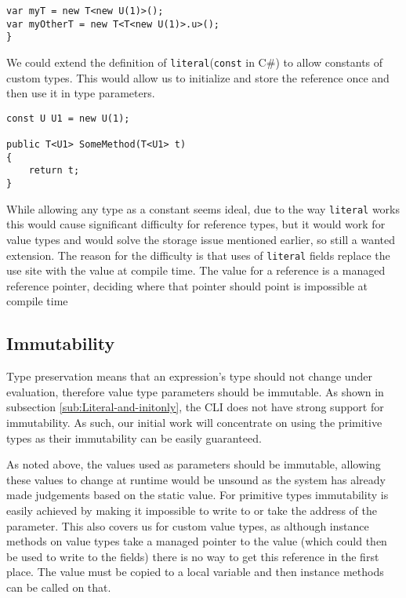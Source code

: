 \begin{lstlisting}[label={lst:refissue},caption={An issue with reference values},keywordstyle={\color{blue}},language=sharpc]
var myT = new T<new U(1)>();
var myOtherT = new T<T<new U(1)>.u>();
}
\end{lstlisting}

We could extend the definition of \texttt{literal}(\texttt{const} in C\#) to allow constants of custom types. This would allow us to 
initialize and store the reference once and then use it in type parameters.

\begin{lstlisting}[caption={Literal references},keywordstyle={\color{blue}},language=sharpc]
const U U1 = new U(1);

public T<U1> SomeMethod(T<U1> t)
{
	return t;
}
\end{lstlisting}

While allowing any type as a constant seems ideal, due to the way \texttt{literal} works this would cause significant 
difficulty for reference types, but it would work for value types and would solve the storage issue mentioned earlier, 
so still a wanted extension.
The reason for the difficulty is that uses of \texttt{literal} fields replace the use site with the value at compile time. 
The value for a reference is a managed reference pointer, deciding where that pointer should point is impossible at compile time

\subsection{Immutability}

Type preservation means that an expression's type should not change
under evaluation, therefore value type parameters should be immutable.
As shown in subsection \ref{sub:Literal-and-initonly}, the CLI does
not have strong support for immutability. As such, our initial work
will concentrate on using the primitive types as their immutability
can be easily guaranteed.

As noted above, the values used as parameters should be immutable, allowing these values to change at runtime would be unsound 
as the system has already made judgements based on the static value. For primitive types immutability is easily achieved by making 
it impossible to write to or take the address of the parameter. This also covers us for custom value types, as although instance 
methods on value types take a managed pointer to the value (which could then be used to write to the fields) there is no way to
get this reference in the first place. The value must be copied to a local variable and then instance methods can be called on that.

